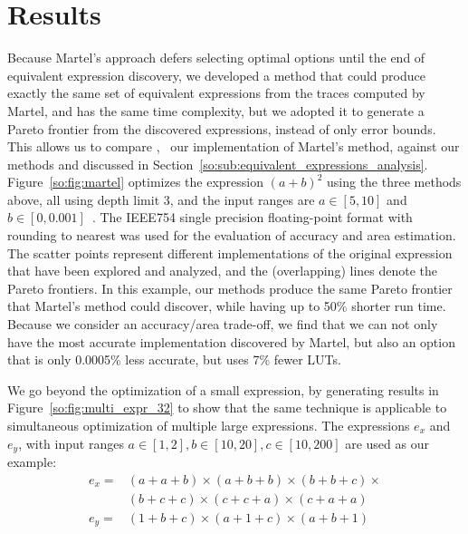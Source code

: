 \section{Results}
\label{so:sec:results}

Because Martel's approach defers selecting optimal options until the end of
equivalent expression discovery, we developed a method that could produce
exactly the same set of equivalent expressions from the traces computed by
Martel, and has the same time complexity, but we adopted it to generate
a Pareto frontier from the discovered expressions, instead of only error
bounds.  This allows us to compare \marteltrace{}, \ie~our implementation
of Martel's method, against our methods \frontiertrace{} and \greedytrace{}
discussed in Section~\ref{so:sub:equivalent_expressions_analysis}.
Figure~\ref{so:fig:martel} optimizes the expression ${(a + b)}^2$ using the
three methods above, all using depth limit $3$, and the input ranges are
$a \in [5, 10]$ and $b \in [0, 0.001]$~\cite{martel07}. The IEEE754 single
precision floating-point format with rounding to nearest was used for the
evaluation of accuracy and area estimation. The scatter points represent
different implementations of the original expression that have been explored
and analyzed, and the (overlapping) lines denote the Pareto frontiers. In this
example, our methods produce the same Pareto frontier that Martel's method
could discover, while having up to 50\% shorter run time. Because we consider
an accuracy/area trade-off, we find that we can not only have the most accurate
implementation discovered by Martel, but also an option that is only 0.0005\%
less accurate, but uses 7\% fewer LUTs.

We go beyond the optimization of a small expression, by generating results in
Figure~\ref{so:fig:multi_expr_32} to show that the same technique is applicable
to simultaneous optimization of multiple large expressions. The expressions
$e_x$ and $e_y$, with input ranges $a \in [1, 2], b \in [10, 20], c \in [10,
200]$ are used as our example:
\begin{equation}
    \begin{aligned}
    e_x =& (a + a + b) \times (a + b + b) \times (b + b + c) \times {} \\
         & (b + c + c) \times (c + c + a) \times (c + a + a) \\
    e_y =& (1 + b + c) \times (a + 1 + c) \times (a + b + 1)
    \end{aligned}
\end{equation}

